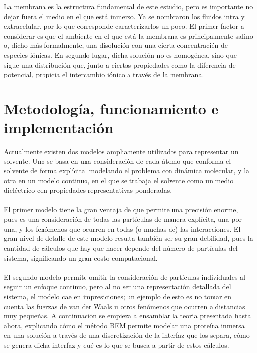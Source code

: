 \documentclass[12pt, twoside, onehalfspace, numbers, spanish]{ezthesis}
\numberwithin{equation}{section}
\begin{document}
La membrana es la estructura fundamental de este estudio, pero es importante no dejar fuera el medio en el que está inmerso. Ya se nombraron los fluidos intra y extracelular, por lo que corresponde caracterizarlos un poco. El primer factor a considerar es que el ambiente en el que está la membrana es principalmente salino o, dicho más formalmente, una disolución con una cierta concentración de especies iónicas. En segundo lugar, dicha solución no es homogénea, sino que sigue una distribución que, junto a ciertas propiedades como la diferencia de potencial, propicia el intercambio iónico a través de la membrana.






\chapter{Metodología, funcionamiento e implementación}\label{Chap:Method}
Actualmente existen dos modelos ampliamente utilizados para representar un solvente. Uno se basa en una consideración de cada átomo que conforma el solvente de forma explícita, modelando el problema con dinámica molecular, y la otra en un modelo continuo, en el que se trabaja el solvente como un medio dieléctrico con propiedades representativas ponderadas.\\\\
El primer modelo tiene la gran ventaja de que permite una precisión enorme, pues es una consideración de todas las partículas de manera explícita, una por una, y los fenómenos que ocurren en todas (o muchas de) las interacciones. El gran nivel de detalle de este modelo resulta también ser su gran debilidad, pues la cantidad de cálculos que hay que hacer depende del número de partículas del sistema, significando un gran costo computacional.\\\\
El segundo modelo permite omitir la consideración de partículas individuales al seguir un enfoque continuo, pero al no ser una representación detallada del sistema, el modelo cae en impresiciones; un ejemplo de esto es no tomar en cuenta las fuerzas de van der Waals u otros fenómenos que ocurren a distancias muy pequeñas. A continuación se empieza a ensamblar la teoría presentada hasta ahora, explicando cómo el método BEM permite modelar una proteína inmersa en una solución a través de una discretización de la interfaz que los separa, cómo se genera dicha interfaz y qué es lo que se busca a partir de estos cálculos.
\end{document}
